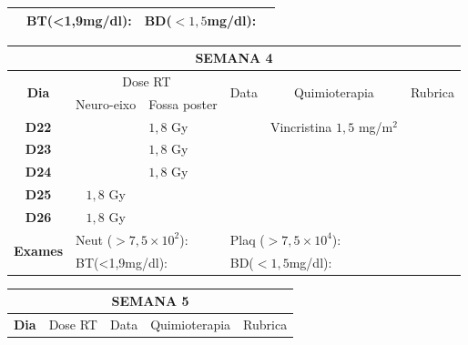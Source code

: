 \documentclass[11pt,a4paper,oldfontcommands]{memoir}
\begin{document}
\begin{center}
\begin{table}[H]
\begin{tabular}{p{1cm}p{2cm}|p{2cm}|p{1cm}|p{4cm}|p{3cm}}
    \cline{2-6}
    \multicolumn{1}{c|}{\multirow{2}{*}{{}}}&\multicolumn{2}{l|}{BT(<1,9mg/dl):}&\multicolumn{2}{l|}{BD(\(<1,5\)mg/dl):}&
    \\
    \hline
\end{tabular}
\end{table}
\begin{table}[H]
\begin{tabular}{p{1cm}p{2cm}|p{2cm}|p{1cm}|p{4cm}|p{3cm}}
	\hline
	\multicolumn{6}{c}{\textbf{SEMANA 4}}\\
\hline
    \multicolumn{1}{c|}{\multirow{2}{*}{\textbf{Dia}}}&\multicolumn{2}{c|}{Dose RT}&\multicolumn{1}{c|}{\multirow{2}{*}{Data}}&\multicolumn{1}{c|}{\multirow{2}{*}{Quimioterapia}}&\multicolumn{1}{c}{\multirow{2}{*}{Rubrica}} \\
    \cline{2-3}
    \multicolumn{1}{c|}{\multirow{1}{*}{}}&{Neuro-eixo}&{Fossa poster}&& \\
	\hline
	\multicolumn{1}{c|}{\multirow{1}{*}{\textbf{D22}}}&\multicolumn{1}{c|}{}&{\(1,8\) Gy}&&{Vincristina \(1,5\) mg/m\(^2\)}&\\
    \multicolumn{1}{c|}{\multirow{1}{*}{\textbf{D23}}}&\multicolumn{1}{c|}{}&{\(1,8\) Gy}&&{}&\\
    \multicolumn{1}{c|}{\multirow{1}{*}{\textbf{D24}}}&\multicolumn{1}{c|}{}&{\(1,8\) Gy}&&{}&\\
    \multicolumn{1}{c|}{\multirow{1}{*}{\textbf{D25}}}&\multicolumn{1}{c|}{\(1,8\) Gy}&&&{}&\\
    \multicolumn{1}{c|}{\multirow{1}{*}{\textbf{D26}}}&\multicolumn{1}{c|}{\(1,8\) Gy}&&&{}&\\
    \hline
    \multicolumn{1}{c|}{\multirow{2}{*}{\textbf{Exames}}}&\multicolumn{2}{l|}{Neut (\(>7,5\times10^2\)):}&\multicolumn{2}{l|}{Plaq (\(>7,5\times10^4\)):}&\\
    \cline{2-6}
    \multicolumn{1}{c|}{\multirow{2}{*}{{}}}&\multicolumn{2}{l|}{BT(<1,9mg/dl):}&\multicolumn{2}{l|}{BD(\(<1,5\)mg/dl):}&
    \\
    \hline
\end{tabular}
\end{table}
\begin{table}[H]
\begin{tabular}{p{1cm}p{2cm}|p{2cm}|p{1cm}|p{4cm}|p{3cm}}
	\hline
	\multicolumn{6}{c}{\textbf{SEMANA 5}}\\
\hline
    \multicolumn{1}{c|}{\multirow{2}{*}{\textbf{Dia}}}&\multicolumn{2}{c|}{Dose RT}&\multicolumn{1}{c|}{\multirow{2}{*}{Data}}&\multicolumn{1}{c|}{\multirow{2}{*}{Quimioterapia}}&\multicolumn{1}{c}{\multirow{2}{*}{Rubrica}} \\

\end{tabular}
\end{table}
\end{center}
\end{document}
